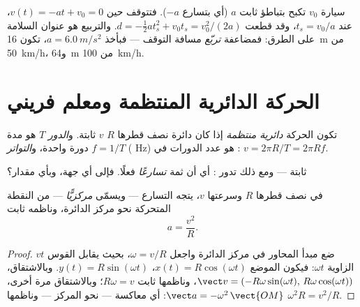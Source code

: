 \begin{example}\label{ex:g12:kinematics-2d:braking}
سيارة  $v_0$ تكبح بتباطؤ ثابت $a$
(أي بتسارع $-a$). فتتوقف حين $v(t) = -a t + v_0 = 0$، عند
$t_s = v_0/a$، وقد قطعت $d = -\tfrac12 a t_s^2 + v_0 t_s =
v_0^2/(2a)$. والتربيع هو عنوان السلامة على الطرق:
فمضاعفة  \emph{تربّع} مسافة التوقف --- فبأخذ $a =
\qty{6.0}{m/s^2}$، تكون \qty{16}{m} من \qty{50}{km/h}، و\qty{64}{m} من
\qty{100}{km/h}.
\end{example}

\section{الحركة الدائرية المنتظمة ومعلم فريني}

\begin{definition}\label{def:g12:kinematics-2d:ucm}
تكون الحركة \emph{دائرية منتظمة}
إذا كان  دائرة نصف قطرها $R$  $v$
ثابتة. و\emph{الدور} $T$ هو
مدة دورة واحدة، و\emph{التواتر}
$f = 1/T$ ( \unit{Hz}) هو عدد الدورات في :
$v = 2\pi R/T = 2\pi R f$.
\end{definition}

 ثابتة --- ومع ذلك تدور : أي أن ثمة \emph{تسارعًا}
فعلًا. فإلى أي جهة، وبأي مقدار؟

\begin{theorem}\label{thm:g12:kinematics-2d:centripetal}
%
في  نصف قطرها $R$ وسرعتها $v$، يتجه
التسارع --- ويسمّى \emph{مركزيًّا} --- من النقطة
المتحركة نحو مركز الدائرة، وناظمه ثابت
\[
a = \frac{v^2}{R}.
\]
\end{theorem}

\begin{proof}
ضع مبدأ المحاور في مركز الدائرة واجعل $\omega = v/R$، بحيث يقابل
القوس $v t$ الزاوية $\omega t$: فيكون الموضع
$x(t) = R\cos(\omega t)$، $y(t) = R\sin(\omega t)$. وبالاشتقاق،
$\vect v = (-R\omega\sin(\omega t),\, R\omega\cos(\omega t))$، وناظمها
ثابت $R\omega = v$؛ وبالاشتقاق مرة أخرى،
$\vect a = -\omega^2\,\vect{OM}$: أي معاكسة  ---
نحو المركز --- وناظمها $\omega^2 R = v^2/R$.
\end{proof}

